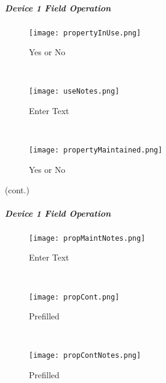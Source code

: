 
 \vspace{5.5in}


 \clearpage


 \subparagraph*{Device 1 Field Operation}
 \begin{wrapfigure}{r}{0.6\textwidth}
 \centering
     \texttt{[image: propertyInUse.png]}
 \caption {Yes or No}
 \vspace{.05in}

 \HRule \\[.4cm] %
 \vspace{.1in}

     \texttt{[image: useNotes.png]}
 \caption {Enter Text}
 \vspace{.05in}

 \HRule \\[.4cm] %
 \vspace{.1in}

     \texttt{[image: propertyMaintained.png]}
 \caption{Yes or No}
 \end{wrapfigure}

 {\footnotesize (cont.)}
 \vspace{.75in}

 \vspace{2.75in}

 \vspace{2.25in}


 \clearpage

 \subparagraph*{Device 1 Field Operation}

 \begin{wrapfigure}{r}{0.6\textwidth}
 \centering
     \texttt{[image: propMaintNotes.png]}%
 \caption {Enter Text}
 \vspace{.05in}

 \HRule \\[.4cm] %
 \vspace{.1in}

     \texttt{[image: propCont.png]}%
 \caption {Prefilled}
 \vspace{.05in}

 \HRule \\[.4cm] %
 \vspace{.1in}

     \texttt{[image: propContNotes.png]}
 \caption{Prefilled}
 \end{wrapfigure}

